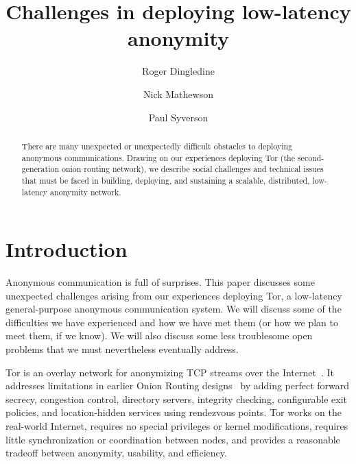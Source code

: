 \documentclass{llncs}
\begin{document}
\title{Challenges in deploying low-latency anonymity}

\author{Roger Dingledine \and Nick Mathewson \and Paul Syverson}


\maketitle
\pagestyle{empty}

\begin{abstract}
  There are many unexpected or unexpectedly difficult obstacles to
  deploying anonymous communications.  Drawing on our experiences deploying
  Tor (the second-generation onion routing network), we describe social
  challenges and technical issues that must be faced
  in building, deploying, and sustaining a scalable, distributed, low-latency
  anonymity network.
\end{abstract}

\section{Introduction}
Anonymous communication is full of surprises.  This paper discusses some
unexpected challenges arising from our experiences deploying Tor, a
low-latency general-purpose anonymous communication system.  We will discuss
some of the difficulties we have experienced and how we have met them (or how
we plan to meet them, if we know).  We will also discuss some less
troublesome open problems that we must nevertheless eventually address.

Tor is an overlay network for anonymizing TCP streams over the
Internet~\cite{tor-design}.  It addresses limitations in earlier Onion
Routing designs~\cite{or-ih96,or-jsac98,or-discex00,or-pet00} by adding
perfect forward secrecy, congestion control, directory servers, integrity
checking, configurable exit policies, and location-hidden services using
rendezvous points.  Tor works on the real-world Internet, requires no special
privileges or kernel modifications, requires little synchronization or
coordination between nodes, and provides a reasonable tradeoff between
anonymity, usability, and efficiency.
\end{document}
